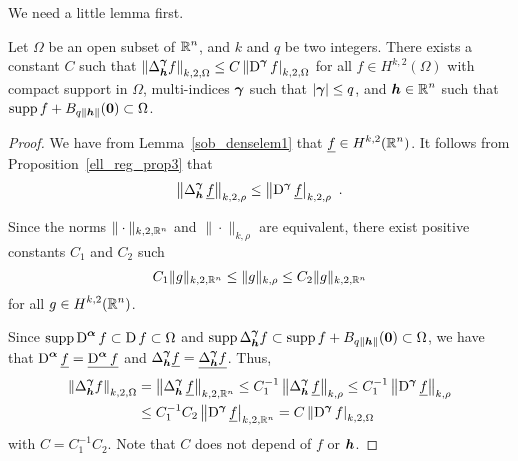 We need a little lemma first.

\begin{lemma} \label{ellRegProp3Omega}
Let $\Omega$ be an open subset of $\displaystyle \mathbb{R}^n$, and $k$ and $q$ be two
integers.  There exists a constant $C$ such that
$\displaystyle \left\| \Delta^{{\bm{\gamma}}}_{{\bm{h}}} f  \right\|_{k,2,\Omega}
\leq C \left\| \operatorname{D}^{{\bm{\gamma}}} f\right|_{k,2,\Omega}$ for all
$\displaystyle f\in H^{k,2}(\Omega)$ with compact support in $\Omega$,
multi-indices ${\bm{\gamma}}$ such that $|{\bm{\gamma}}|\leq q$, and
$\displaystyle {\bm{h}} \in \mathbb{R}^n$ such that
$\displaystyle \operatorname{supp} f + B_{q\|{\bm{h}}\|}({\bm{0}}) \subset \Omega$.
\end{lemma}

\begin{proof}
We have from Lemma~\ref{sob_denselem1} that
$\displaystyle \underline{f} \in H^{k,2}(\mathbb{R}^n)$.  It follows from
Proposition~\ref{ell_reg_prop3} that
\[
\left\| \Delta^{\VEC{\gamma}}_{\VEC{h}}\, \underline{f}  \right\|_{k,2,\rho}
\leq \left\| \diff^{\VEC{\gamma}} \underline{f}\right|_{k,2,\rho} \ .
\]

Since the norms $\|\cdot\|_{k,2,\mathbb{R}^n}$ and $\|\cdot\|_{k,\rho}$ are
equivalent, there exist positive constants $C_1$ and $C_2$ such
\[
  C_1 \|g\|_{k,2,\mathbb{R}^n} \leq \|g\|_{k,\rho} \leq C_2 \|g\|_{k,2,\mathbb{R}^n}
\]
for all $\displaystyle g \in H^{k,2}(\mathbb{R}^n)$.

Since $\displaystyle \operatorname{supp} \operatorname{D}^{{\bm{\alpha}}} f \subset \operatorname{D} f
\subset \Omega$ and
$\displaystyle \operatorname{supp} \Delta^{{\bm{\gamma}}}_{{\bm{h}}} f \subset
\operatorname{supp} f + B_{q\|{\bm{h}}\|}({\bm{0}}) \subset \Omega$, we have that
$\displaystyle \operatorname{D}^{{\bm{\alpha}}} \underline{f}
= \underline{\operatorname{D}^{{\bm{\alpha}}} f}$
and $\displaystyle \Delta^{{\bm{\gamma}}}_{{\bm{h}}} \underline{f}
= \underline{\Delta^{{\bm{\gamma}}}_{{\bm{h}}} f}$.  Thus,
\begin{align*}
\left\| \Delta^{{\bm{\gamma}}}_{{\bm{h}}} f  \right\|_{k,2,\Omega}
&= \left\| \Delta^{{\bm{\gamma}}}_{{\bm{h}}}\, \underline{f}  \right\|_{k,2,\mathbb{R}^n}
\leq C_1^{-1} \left\| \Delta^{{\bm{\gamma}}}_{{\bm{h}}}\, \underline{f}
\right\|_{k,\rho} 
\leq C_1^{-1} \left\| \operatorname{D}^{{\bm{\gamma}}} \underline{f}  \right\|_{k,\rho} \\
&\leq C_1^{-1} C_2 \left\| \operatorname{D}^{{\bm{\gamma}}} \underline{f} \right|_{k,2,\mathbb{R}^n}
= C \left\| \operatorname{D}^{{\bm{\gamma}}} f \right|_{k,2,\Omega}
\end{align*}
with $C = C_1^{-1} C_2$.  Note that $C$ does not depend of $f$ or ${\bm{h}}$.
\end{proof}

